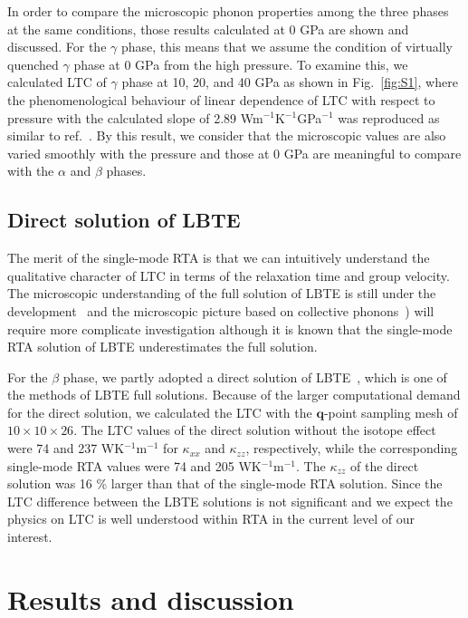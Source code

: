 \documentclass[twocolumn,amsmath,amssymb,a4paper,prb,superscriptaddress,floatfix]{revtex4-1}
\begin{document}
In order to compare the microscopic phonon properties among the three
phases at the same conditions, those results calculated at 0 GPa are
shown and discussed. For the $\gamma$ phase, this means that we assume
the condition of virtually quenched $\gamma$ phase at 0 GPa from the
high pressure. To examine this, we calculated LTC of $\gamma$ phase at
10, 20, and 40 GPa as shown in Fig.~\ref{fig:S1}, where the
phenomenological behaviour of linear dependence of LTC with respect to
pressure with the calculated slope of 2.89 Wm$^{-1}$K$^{-1}$GPa$^{-1}$
was reproduced as similar to ref.~. By this result, we consider that
the microscopic values are also varied smoothly with the pressure and
those at 0 GPa are meaningful to compare with the $\alpha$ and $\beta$
phases.

\subsection{Direct solution of LBTE}
The merit of the single-mode RTA is that we can intuitively understand
the qualitative character of LTC in terms of the relaxation time and
group velocity. The microscopic understanding of the full solution of
LBTE is still under the development~\cite{cepellotti-relaxons}
and the microscopic picture based
on collective phonons~\cite{hardy-collective}) will
require more complicate investigation although it is known that the
single-mode RTA solution of LBTE underestimates the full solution.~\cite{mukhopadhyay-ltc,ward-ltc}


For the $\beta$ phase, we partly adopted a direct solution of LBTE~\cite{chaput-direct},
which is one of the methods of LBTE full solutions. Because of the
larger computational demand for the direct solution, we calculated the
LTC with the $\mathbf{q}$-point sampling mesh of $10\times 10\times
26$. The LTC values of the direct solution without the isotope effect
were 74 and 237 WK$^{-1}$m$^{-1}$ for $\kappa_{xx}$ and $\kappa_{zz}$,
respectively, while the corresponding single-mode RTA values were 74 and
205 WK$^{-1}$m$^{-1}$. The $\kappa_{zz}$ of the direct solution was 16
\% larger than that of the single-mode RTA solution. Since the LTC
difference between the LBTE solutions is not significant and we expect
the physics on LTC is well understood within RTA in the current level of
our interest.

\section{Results and discussion}
\end{document}

